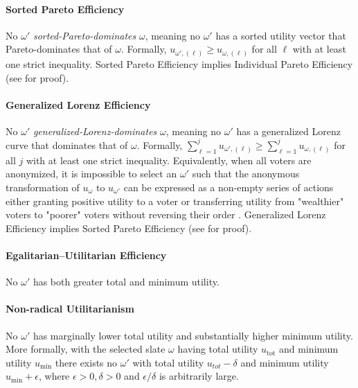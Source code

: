 \documentclass[letterpaper]{article} %
\begin{document}
\paragraph{Sorted Pareto Efficiency \citep{sorted-pareto}}
No $\omega'$ \emph{sorted-Pareto-dominates} $\omega$, meaning no $\omega'$ has a sorted utility vector that Pareto-dominates that of $\omega$.
Formally, $u_{\omega',(\ell)}\ge u_{\omega,(\ell)}$ for all $\ell$ with at least one strict inequality.
Sorted Pareto Efficiency implies Individual Pareto Efficiency (see  for proof).

\paragraph{Generalized Lorenz Efficiency \citep{shorrocks-1983}}
No $\omega'$ \emph{generalized-Lorenz-dominates} $\omega$, meaning no $\omega'$ has a generalized Lorenz curve that dominates that of $\omega$.
Formally, $\sum_{\ell=1}^{j}u_{\omega',(\ell)}\ge\sum_{\ell=1}^{j}u_{\omega,(\ell)}$ for all $j$ with at least one strict inequality.
Equivalently, when all voters are anonymized, it is impossible to select an $\omega'$ such that the anonymous transformation of $u_{\omega}$ to $u_{\omega'}$ can be expressed as a non-empty series of actions either granting positive utility to a voter or transferring utility from "wealthier" voters to "poorer" voters without reversing their order \citep[Thm.~1]{kostreva-ogryczak-wierzbicki-2004}.
Generalized Lorenz Efficiency implies Sorted Pareto Efficiency (see  for proof).

\paragraph{Egalitarian--Utilitarian Efficiency}
No $\omega'$ has both greater total and minimum utility.

\paragraph{Non-radical Utilitarianism}
No $\omega'$ has marginally lower total utility and substantially higher minimum utility.
More formally, with the selected slate $\omega$ having total utility $u_{\mathrm{tot}}$ and minimum utility $u_{\mathrm{min}}$ there exists no $\omega'$ with total utility $u_{tot} - \delta$ and minimum utility $u_{\mathrm{min}} + \epsilon$, where $\epsilon > 0, \delta > 0$ and $\epsilon/\delta$ is arbitrarily large.
\end{document}

